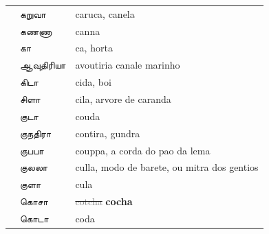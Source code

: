 \documentclass[12pt,a4paper]{scrbook}
\begin{document}
\begin{tabular}{lll}
        
    
        
           &
          கறுவா &
          caruca, canela \\
    
        
    
        
           &
          கணணா &
          canna \\
    
        
    
        
           &
          கா &
          ca, horta \\
    
        
    
        
           &
          ஆவுதிரியா &
          avoutiria	canale marinho \\
    
        
    
        
           &
          கிடா &
          cida, boi \\
    
        
    
        
           &
          சிளா &
          cila, arvore de caranda \\
    
        
    
        
           &
          குடா &
          couda \\
    
        
    
        
           &
          குநதிரா &
          contira, gundra \\
    
        
    
        
           &
          குபபா &
          couppa, a corda do pao da lema \\
    
        
    
        
           &
          குலலா &
          culla, 	modo de barete, ou mitra dos gentios \\
    
        
    
        
           &
          குளா &
          cula \\
    
        
    
        
           &
          கொசா &
          
            \sout{\textcolor{gray}{cotcha}}
            \textbf{cocha}
           \\
    
        
    
        
           &
          கொடா &
          coda \\
    
        
    
      
\end{tabular}
    
\end{document}
